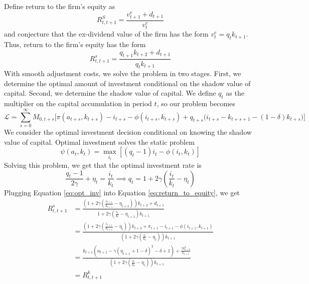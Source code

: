 \documentclass[12pt,letter]{article}
\begin{document}
Define return to the firm's equity as 
\begin{equation*}
	R^S_{t, t+1} = \frac{v^e_{t+1}+d_{t+1}}{v_t^e}
\end{equation*}
and conjecture that the ex-dividend value of the firm has the form $v^e_t = q_t k_{t+1}$. Thus, return to the firm's equity has the form 
\begin{equation}
	R^s_{t, t+1} =\frac{q_{t+1}k_{t+2}+ d_{t+1}}{q_t k_{t+1}}
	\label{eq:return_to_equity}
\end{equation} 
With smooth adjustment costs, we solve the problem in two stages. First, we determine the optimal amount of investment conditional on the shadow value of capital. Second, we determine the shadow value of capital. We define $q_t$ as the multiplier on the capital accumulation in period $t$, so our problem becomes 
\begin{equation*}
	\mathcal{L} = \sum_{s=0}^{\infty}M_{0, t+s}\bigg[\pi(a_{t+s}, k_{t+s}) - i_{t+s}-\phi(i_{t+s}, k_{t+s}) + q_{t+s}\bigg(i_{t+s}-k_{t+s+1}-(1-\delta)k_{t+s}\bigg)\bigg]
\end{equation*}
We  consider the optimal investment decision conditional on knowing the shadow value of capital. Optimal investment solves the static problem
\begin{equation*}
\psi(a_t, k_t) = \max_{i_t}\left[(q_t-1)i_t - \phi(i_t, k_t)\right]
\end{equation*}
Solving this problem, we get that the optimal investment rate is
\begin{equation}
\frac{q_{t}-1}{2\gamma} + \eta_t = \frac{i_t}{k_t} \implies q_t = 1 + 2\gamma\left(\frac{i_t}{k_t}-\eta_t\right)
\label{eq:opt_inv}
\end{equation}
Plugging Equation \ref{eq:opt_inv} into Equation \ref{eq:return_to_equity}, we get 
\begin{equation*}
\begin{split}
		R^s_{t, t+1} &=\frac{\left(1 + 2\gamma\left(\frac{i_{t+1}}{k_{t+1}}-\eta_{t+1}\right)\right)k_{t+2}+ d_{t+1}}{1 + 2\gamma\left(\frac{i_t}{k_t}-\eta_{t+1}\right)k_{t+1}}\\
		&= \frac{\left(1 + 2\gamma\left(\frac{i_{t+1}}{k_{t+1}}-\eta_t\right)\right)k_{t+2}+ \pi_{t+1} - i_{t+1}- \phi(i_{t+1}, k_{t+1})}{(1 + 2\gamma\left(\frac{i_t}{k_t}-\eta_t\right))k_{t+1}}\\
		& = \frac{k_{t+1} \left(a_{t+1}-\gamma  (\eta_{t+1}+1-\delta)^2-\delta +1\right)+\frac{\gamma k_{t+2}^2}{k_{t+1}}}{(1 + 2\gamma\left(\frac{i_t}{k_t}-\eta_t\right))k_{t+1}}\\
		& = R^k_{t, t+1}
\end{split}
\end{equation*}
\end{document}
